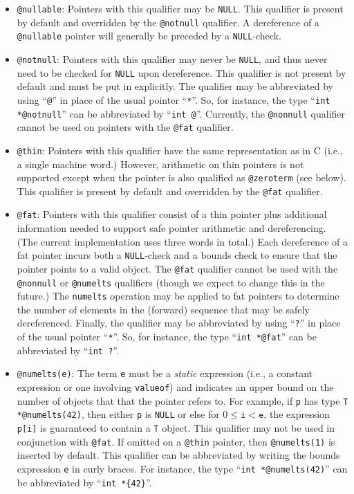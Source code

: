 \begin{itemize}
\item \texttt{@nullable}:  Pointers with this qualifier may be \texttt{NULL}.
This qualifier is present by default and overridden by the \texttt{@notnull}
qualifier.  A dereference of a \texttt{@nullable} pointer will generally
be preceded by a \texttt{NULL}-check.  

\item \texttt{@notnull}:  Pointers with this qualifier may never be 
\texttt{NULL}, and thus never need to be checked for \texttt{NULL}
upon dereference.  This qualifier is not present by default and must be
put in explicitly.  The qualifier may be abbreviated by using ``\texttt{@}''
in place of the usual pointer ``\texttt{*}''.  So, for instance,
the type ``\texttt{int *@notnull}'' can be abbreviated by 
``\texttt{int @}''.  Currently, the \texttt{@nonnull} qualifier cannot be 
used on pointers with the \texttt{@fat} qualifier.  

\item \texttt{@thin}:  Pointers with this qualifier have the same
representation as in C (i.e., a single machine word.)  However,
arithmetic on thin pointers is not supported except when the
pointer is also qualified as \texttt{@zeroterm} (see below).  
This qualifier is present by default and overridden by the \texttt{@fat} 
qualifier.

\item \texttt{@fat}:  Pointers with this qualifier consist of a
thin pointer plus additional information needed to support safe
pointer arithmetic and dereferencing.  (The current implementation
uses three words in total.)  Each dereference of a fat
pointer incurs both a \texttt{NULL}-check and a bounds check to
ensure that the pointer points to a valid object.  The 
\texttt{@fat} qualifier
cannot be used with the \texttt{@nonnull} or \texttt{@numelts}
qualifiers (though we expect to change this in the future.)  
The \texttt{numelts} operation may be applied to fat pointers to
determine the number of elements in the (forward) sequence that
may be safely dereferenced.  Finally, the qualifier may be 
abbreviated by using ``\texttt{?}''
in place of the usual pointer ``\texttt{*}''.  So, for instance,
the type ``\texttt{int *@fat}'' can be abbreviated by 
``\texttt{int ?}''.  

\item \texttt{@numelts(e)}:  The term \texttt{e} must be a \emph{static}
expression (i.e., a constant expression or one involving \texttt{valueof})
and indicates an upper bound on the number of objects that
that the pointer refers to.  For example, if \texttt{p} has type
\texttt{T *@numelts(42)}, then either \texttt{p} is \texttt{NULL}
or else for $0 \leq \texttt{i} < \texttt{e}$, the expression 
\texttt{p[i]} is guaranteed to
contain a \texttt{T} object.  This qualifier may not be used 
in conjunction with \texttt{@fat}.  If omitted on a \texttt{@thin}
pointer, then \texttt{@numelts(1)} is inserted by default.  This
qualifier can be abbreviated by writing the bounds expression \texttt{e}
in curly braces.  For instance, the type ``\texttt{int *@numelts(42)}''
can be abbreviated by ``\texttt{int *\{42\}}''.


\end{itemize}
